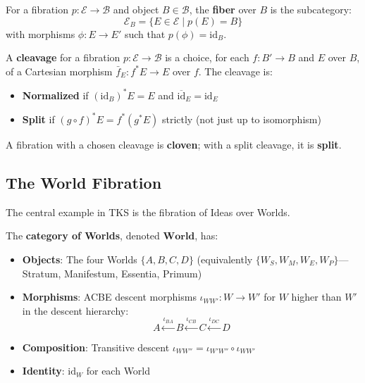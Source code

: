 \begin{definition}
\label{def:fiber-category}
For a fibration $p : \mathcal{E} \to \mathcal{B}$ and object $B \in \mathcal{B}$,
the \textbf{fiber} over $B$ is the subcategory:
\[
  \mathcal{E}_B = \{E \in \mathcal{E} \mid p(E) = B\}
\]
with morphisms $\phi : E \to E'$ such that $p(\phi) = \mathrm{id}_B$.
\end{definition}

\begin{definition}[Cleavage]
\label{def:cleavage}
A \textbf{cleavage} for a fibration $p : \mathcal{E} \to \mathcal{B}$ is a choice,
for each $f : B' \to B$ and $E$ over $B$, of a Cartesian morphism
$\bar{f}_E : f^*E \to E$ over $f$. The cleavage is:
\begin{itemize}
  \item \textbf{Normalized} if $(\mathrm{id}_B)^*E = E$ and $\overline{\mathrm{id}}_E = \mathrm{id}_E$
  \item \textbf{Split} if $(g \circ f)^*E = f^*(g^*E)$ strictly (not just up to isomorphism)
\end{itemize}
A fibration with a chosen cleavage is \textbf{cloven}; with a split cleavage,
it is \textbf{split}.
\end{definition}

\subsection{The World Fibration}
\label{subsec:world-fibration}

The central example in TKS is the fibration of Ideas over Worlds.

\begin{definition}
\label{def:category-worlds}
The \textbf{category of Worlds}, denoted $\mathbf{World}$, has:
\begin{itemize}
  \item \textbf{Objects}: The four Worlds $\{A, B, C, D\}$ (equivalently
        $\{W_S, W_M, W_E, W_P\}$---Stratum, Manifestum, Essentia, Primum)
  \item \textbf{Morphisms}: ACBE descent morphisms $\iota_{WW'} : W \to W'$
        for $W$ higher than $W'$ in the descent hierarchy:
        \[
          A \xleftarrow{\iota_{BA}} B \xleftarrow{\iota_{CB}} C \xleftarrow{\iota_{DC}} D
        \]
  \item \textbf{Composition}: Transitive descent $\iota_{WW''} = \iota_{W'W''} \circ \iota_{WW'}$
  \item \textbf{Identity}: $\mathrm{id}_W$ for each World
\end{itemize}
\end{definition}

